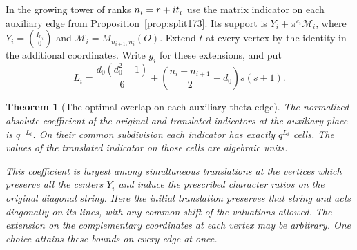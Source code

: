 \documentclass[a4paper,11pt]{article}
\newtheorem{theorem}[proposition]{Theorem}
\theoremstyle{definition}
\theoremstyle{remark}
\numberwithin{equation}{section}
\begin{document}
In the growing tower of ranks $n_i=r+it_{\rm r}$ use the matrix
indicator on each auxiliary edge from Proposition~\ref{prop:split173}.
Its support is $Y_i+\pi^{c_i}\mathcal M_i$, where
$Y_i=\binom{I_{n_i}}{0}$ and $\mathcal M_i=M_{n_{i+1},n_i}(O)$.
Extend $t$ at every vertex by the identity in the additional
coordinates. Write $g_i$ for these extensions, and put
\[
   L_i=\frac{d_0(d_0^2-1)}{6}
             +\left(\frac{n_i+n_{i+1}}2-d_0\right)s(s+1).
\]

\begin{theorem}[The optimal overlap on each auxiliary theta edge]\leavevmode\label{thm:auxoverlap341}
The normalized absolute coefficient of the original and translated
indicators at the auxiliary place is $q^{-L_i}$. On their common
subdivision each indicator has exactly $q^{L_i}$ cells. The values
of the translated indicator on those cells are algebraic units.

This coefficient is largest among simultaneous translations at the
vertices which preserve all the centers $Y_i$ and induce the
prescribed character ratios on the original diagonal string.
Here the initial translation preserves that string and acts diagonally
on its lines, with any common shift of the valuations allowed. The
extension on the complementary coordinates at each vertex may be
arbitrary. One choice attains these bounds on every edge at once.
\end{theorem}
\end{document}
